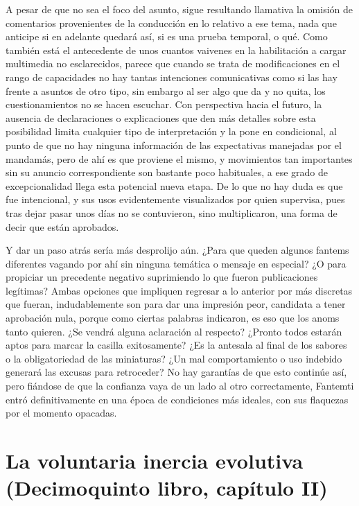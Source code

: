 \documentclass[
]{book}
\begin{document}
A pesar de que no sea el foco del asunto, sigue resultando llamativa la omisión de comentarios provenientes de la conducción en lo relativo a ese tema, nada que anticipe si en adelante quedará así, si es una prueba temporal, o qué. Como también está el antecedente de unos cuantos vaivenes en la habilitación a cargar multimedia no esclarecidos, parece que cuando se trata de modificaciones en el rango de capacidades no hay tantas intenciones comunicativas como si las hay frente a asuntos de otro tipo, sin embargo al ser algo que da y no quita, los cuestionamientos no se hacen escuchar. Con perspectiva hacia el futuro, la ausencia de declaraciones o explicaciones que den más detalles sobre esta posibilidad limita cualquier tipo de interpretación y la pone en condicional, al punto de que no hay ninguna información de las expectativas manejadas por el mandamás, pero de ahí es que proviene el mismo, y movimientos tan importantes sin su anuncio correspondiente son bastante poco habituales, a ese grado de excepcionalidad llega esta potencial nueva etapa. De lo que no hay duda es que fue intencional, y sus usos evidentemente visualizados por quien supervisa, pues tras dejar pasar unos días no se contuvieron, sino multiplicaron, una forma de decir que están aprobados.

Y dar un paso atrás sería más desprolijo aún. ¿Para que queden algunos fantems diferentes vagando por ahí sin ninguna temática o mensaje en especial? ¿O para propiciar un precedente negativo suprimiendo lo que fueron publicaciones legítimas? Ambas opciones que impliquen regresar a lo anterior por más discretas que fueran, indudablemente son para dar una impresión peor, candidata a tener aprobación nula, porque como ciertas palabras indicaron, es eso que los anoms tanto quieren. ¿Se vendrá alguna aclaración al respecto? ¿Pronto todos estarán aptos para marcar la casilla exitosamente? ¿Es la antesala al final de los sabores o la obligatoriedad de las miniaturas? ¿Un mal comportamiento o uso indebido generará las excusas para retroceder? No hay garantías de que esto continúe así, pero fiándose de que la confianza vaya de un lado al otro correctamente, Fantemti entró definitivamente en una época de condiciones más ideales, con sus flaquezas por el momento opacadas.

\hypertarget{la-voluntaria-inercia-evolutiva-decimoquinto-libro-capuxedtulo-ii}{%
\section{La voluntaria inercia evolutiva (Decimoquinto libro, capítulo II)}\label{la-voluntaria-inercia-evolutiva-decimoquinto-libro-capuxedtulo-ii}}
\end{document}
